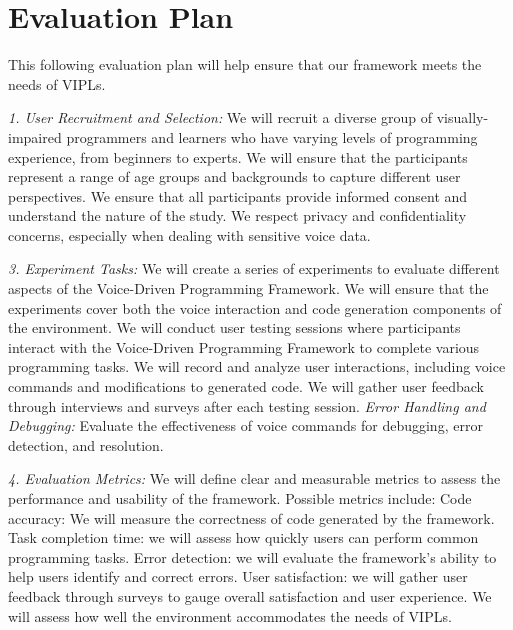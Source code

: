 \section{Evaluation Plan}
\label{eval}





This following evaluation plan will help ensure that our framework meets
the needs of VIPLs.


{\em 1. User Recruitment and Selection:} We will recruit a diverse
group of visually-impaired programmers and learners who have varying
levels of programming experience, from beginners to experts.  We will
ensure that the participants represent a range of age groups and
backgrounds to capture different user perspectives. We ensure that all
participants provide informed consent and understand the nature of the
study.  We respect privacy and confidentiality concerns, especially when
dealing with sensitive voice data.

{\em 3. Experiment Tasks:} We will create a series of experiments to
evaluate different aspects of the Voice-Driven Programming Framework.
We will ensure that the experiments cover both the voice interaction
and code generation components of the environment. We will conduct
user testing sessions where participants interact with the
Voice-Driven Programming Framework to complete various programming
tasks. We will record and analyze user interactions, including voice commands
and modifications to generated code. We will gather user feedback through
interviews and surveys after each testing session. {\em Error Handling
  and Debugging:} Evaluate the effectiveness of voice commands for
debugging, error detection, and resolution.

{\em 4. Evaluation Metrics:} We will define clear and measurable
metrics to assess the performance and usability of the
framework. Possible metrics include: Code accuracy: We will measure
the correctness of code generated by the framework.  Task completion
time: we will assess how quickly users can perform common programming
tasks.  Error detection: we will evaluate the framework's ability to
help users identify and correct errors.  User satisfaction: we will
gather user feedback through surveys to gauge overall
satisfaction and user experience.  We will assess how
well the environment accommodates the needs of VIPLs.

